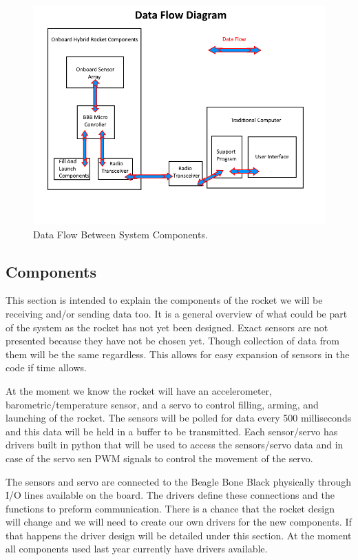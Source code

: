 \documentclass[10pt,draftclsnofoot,onecolumn,compsoc]{IEEEtran}
\begin{document}
\begin{figure}[!ht]
  \caption{Data Flow Between System Components.}
  \centering
	\includegraphics[scale=.85]{RocketBlockDiagram}
\end{figure}
\FloatBarrier

\subsection{Components} 
This section is intended to explain the components of the rocket we will be receiving and/or sending data too. It is a general overview of what could be part of the system as the rocket has not yet been designed. Exact sensors are not presented because they have not be chosen yet. Though collection of data from them will be the same regardless. This allows for easy expansion of sensors in the code if time allows.\par
At the moment we know the rocket will have an accelerometer, barometric/temperature sensor, and a servo to control filling, arming, and launching of the rocket. The sensors will be polled for data every 500 milliseconds and this data will be held in a buffer to be transmitted. Each sensor/servo has drivers built in python that will be used to access the sensors/servo data and in case of the servo sen PWM signals to control the movement of the servo.\par
The sensors and servo are connected to the Beagle Bone Black physically through I/O lines available on the board. The drivers define these connections and the functions to preform communication. There is a chance that the rocket design will change and we will need to create our own drivers for the new components. If that happens the driver design will be detailed under this section. At the moment all components used last year currently have drivers available.\par
\end{document}
